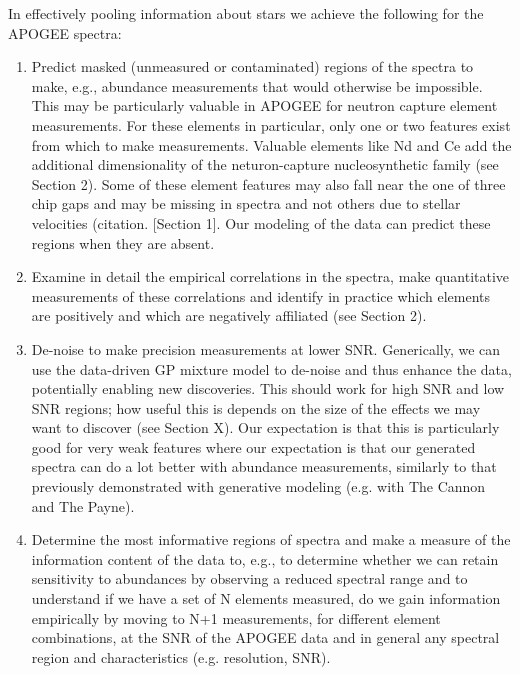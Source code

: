 \documentclass[a4paper,fleqn,usenatbib]{mnras}
\begin{document}
In effectively pooling information about stars we achieve the following for the APOGEE spectra: \\
\begin{enumerate}
\item Predict masked (unmeasured or contaminated) regions of the spectra to make, e.g., abundance measurements that would otherwise be impossible. This may be particularly valuable in APOGEE for neutron capture element measurements. For these elements in particular,  only one or two features exist from which to make measurements. Valuable elements like Nd and Ce add the additional dimensionality of the neturon-capture nucleosynthetic family (see Section 2). Some of these element features may also fall near the one of three chip gaps and may be missing in spectra and not others due to stellar velocities (citation. [Section 1]. Our modeling of the data can predict these regions when they are absent. 
\item Examine in detail the empirical correlations in the spectra, make quantitative measurements of these correlations and identify in practice which elements are positively and which are negatively affiliated (see Section 2). %
\item De-noise to make precision measurements at lower SNR.  Generically, we can use the data-driven GP mixture model to de-noise and thus enhance the data, potentially enabling new discoveries. This should work for high SNR and low SNR regions; how useful this is depends on the size of the effects we may want to discover (see Section X). Our expectation is that this is particularly good for very weak features where our expectation is that our generated spectra can do a lot better with abundance measurements, similarly to that previously demonstrated with generative modeling (e.g. with The Cannon and The Payne).
\item Determine the most informative regions of spectra and make a measure of the information content of the data to, e.g., to determine whether we can retain sensitivity to abundances by observing a reduced spectral range and to understand if we have a set of N elements measured, do we gain information empirically by moving to N+1 measurements, for different element combinations, at the SNR of the APOGEE data and in general any spectral region and characteristics (e.g. resolution, SNR). 
\end{enumerate}
\end{document}
